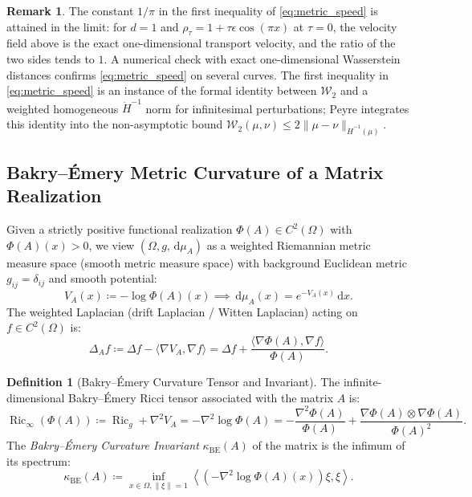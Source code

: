 \documentclass[11pt,a4paper,reqno]{amsart}
\theoremstyle{definition}
\newtheorem{definition}[theorem]{Definition}
\newtheorem{remark}[theorem]{Remark}
\numberwithin{equation}{section}
\newcommand{\dif}{\,\mathrm{d}}
\newcommand{\Ric}{\operatorname{Ric}}
\begin{document}
\begin{remark}
The constant $1/\pi$ in the first inequality of \eqref{eq:metric_speed} is attained in the limit: for $d = 1$ and $\rho_\tau = 1 + \tau \epsilon \cos(\pi x)$ at $\tau = 0$, the velocity field above is the exact one-dimensional transport velocity, and the ratio of the two sides tends to $1$. A numerical check with exact one-dimensional Wasserstein distances confirms \eqref{eq:metric_speed} on several curves. The first inequality in \eqref{eq:metric_speed} is an instance of the formal identity between $\mathcal{W}_2$ and a weighted homogeneous $\dot H^{-1}$ norm for infinitesimal perturbations; Peyre \cite{peyre2018comparison} integrates this identity into the non-asymptotic bound $\mathcal{W}_2(\mu,\nu) \le 2\|\mu - \nu\|_{\dot H^{-1}(\mu)}$.
\end{remark}

\subsection{Bakry--\'Emery Metric Curvature of a Matrix Realization}
Given a strictly positive functional realization $\Phi(A) \in C^2(\Omega)$ with $\Phi(A)(x) > 0$, we view $(\Omega, g, \dif \mu_A)$ as a weighted Riemannian metric measure space (smooth metric measure space) with background Euclidean metric $g_{ij} = \delta_{ij}$ and smooth potential:
\begin{equation}
    V_A(x) \coloneqq -\log \Phi(A)(x) \implies \dif \mu_A(x) = e^{-V_A(x)} \dif x.
\end{equation}
The weighted Laplacian (drift Laplacian / Witten Laplacian) acting on $f \in C^2(\Omega)$ is:
\begin{equation}
    \Delta_A f \coloneqq \Delta f - \langle \nabla V_A, \nabla f \rangle = \Delta f + \frac{\langle \nabla \Phi(A), \nabla f \rangle}{\Phi(A)}.
\end{equation}

\begin{definition}[Bakry--\'Emery Curvature Tensor and Invariant]
The infinite-dimensional Bakry--\'Emery Ricci tensor associated with the matrix $A$ is:
\begin{equation}
    \Ric_\infty(\Phi(A)) \coloneqq \Ric_g + \nabla^2 V_A = -\nabla^2 \log \Phi(A) = -\frac{\nabla^2 \Phi(A)}{\Phi(A)} + \frac{\nabla \Phi(A) \otimes \nabla \Phi(A)}{\Phi(A)^2}.
\end{equation}
The \emph{Bakry--\'Emery Curvature Invariant} $\kappa_{\mathrm{BE}}(A)$ of the matrix is the infimum of its spectrum:
\begin{equation}
    \kappa_{\mathrm{BE}}(A) \coloneqq \inf_{x \in \Omega, \|\xi\|=1} \left\langle \left( -\nabla^2 \log \Phi(A)(x) \right) \xi, \xi \right\rangle.
\end{equation}
\end{definition}
\end{document}
